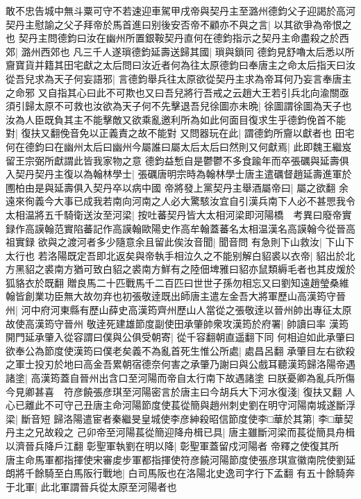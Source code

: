 敢不忠告城中無斗粟可守不若速迎車駕甲戌帝與契丹主至潞州德鈞父子迎謁於高河契丹主慰諭之父子拜帝於馬首進曰别後安否帝不顧亦不與之言|{
	以其欲爭為帝恨之也}
契丹主問德鈞曰汝在幽州所置銀鞍契丹直何在德鈞指示之契丹主命盡殺之於西郊|{
	潞州西郊也}
凡三千人遂瑣德鈞延壽送歸其國|{
	瑣與鎖同}
德鈞見舒嚕太后悉以所齎寶貨并籍其田宅獻之太后問曰汝近者何為往太原德鈞曰奉唐主之命太后指天曰汝從吾兒求為天子何妄語邪|{
	言德鈞舉兵往太原欲從契丹主求為帝耳何乃妄言奉唐主之命邪}
又自指其心曰此不可欺也又曰吾兒將行吾戒之云趙大王若引兵北向渝關亟須引歸太原不可救也汝欲為天子何不先擊退吾兒徐圖亦未晩|{
	徐圖謂徐圖為天子也}
汝為人臣既負其主不能擊敵又欲乘亂邀利所為如此何面目復求生乎德鈞俛首不能對|{
	復扶又翻俛音免以正義責之故不能對}
又問器玩在此|{
	謂德鈞所齎以獻者也}
田宅何在德鈞曰在幽州太后曰幽州今屬誰曰屬太后太后曰然則又何獻焉|{
	此即魏王繼岌留王宗弼所獻謂此皆我家物之意}
德鈞益慙自是鬱鬱不多食踰年而卒張礪與延壽俱入契丹契丹主復以為翰林學士|{
	張礪唐明宗時為翰林學士唐主遣礪督趙延壽進軍於圑柏由是與延壽俱入契丹卒以病中國}
帝將發上黨契丹主舉酒屬帝曰|{
	屬之欲翻}
余遠來徇義今大事已成我若南向河南之人必大驚駭汝宜自引漢兵南下人必不甚愳我令太相温將五千騎衛送汝至河梁|{
	按吐蕃契丹皆大太相河梁即河陽橋　考異曰廢帝實録作高謨翰范實陷蕃記作高謨翰歐陽史作高牟翰蓋蕃名太相温漢名高謨翰今從晉高祖實録}
欲與之渡河者多少隨意余且留此俟汝音聞|{
	聞音問}
有急則下山救汝|{
	下山下太行也}
若洛陽既定吾即北返矣與帝執手相泣久之不能别解白貂裘以衣帝|{
	貂出於北方黑貂之裘南方猶可致白貂之裘南方鮮有之陸佃埤雅曰貂亦鼠類縟毛者也其皮煖於狐貉衣於既翻}
贈良馬二十匹戰馬千二百匹曰世世子孫勿相忘又曰劉知遠趙瑩桑維翰皆創業功臣無大故勿弃也初張敬逹既出師唐主遣左金吾大將軍歷山高漢筠守晉州|{
	河中府河東縣有歷山薛史高漢筠齊州歷山人當從之張敬逹以晉州帥出專征太原故使高漢筠守晉州}
敬逹死建雄節度副使田承肇帥衆攻漢筠於府署|{
	帥讀曰率}
漢筠開門延承肇入從容謂曰僕與公俱受朝寄|{
	從千容翻朝直遥翻下同}
何相迫如此承肇曰欲奉公為節度使漢筠曰僕老矣義不為亂首死生惟公所處|{
	處昌呂翻}
承肇目左右欲殺之軍士投刃於地曰高金吾累朝宿德奈何害之承肇乃謝曰與公戲耳聽漢筠歸洛陽帝遇諸塗|{
	高漢筠蓋自晉州出含口至河陽而帝自太行南下故遇諸塗}
曰朕憂卿為亂兵所傷今見卿甚喜　符彦饒張彦琪至河陽密言於唐主曰今胡兵大下河水復淺|{
	復扶又翻}
人心已離此不可守己丑唐主命河陽節度使萇從簡與趙州刺史劉在明守河陽南城遂斷浮梁|{
	斷音短}
歸洛陽遣宦者秦繼旻皇城使李彦紳殺昭信節度使李□華於其第|{
	李□華契丹主之兄故殺之}
己卯帝至河陽萇從簡迎降舟楫已具|{
	唐主雖斷河梁而萇從簡具舟楫以濟晉兵降戶江翻}
彰聖軍執劉在明以降|{
	彰聖軍蓋留戍河陽者}
帝釋之使復其所　唐主命馬軍都指揮使宋審䖍步軍都指揮使符彦饒河陽節度使張彦琪宣徽南院使劉延朗將千餘騎至白馬阪行戰地|{
	白司馬阪也在洛陽北史逸司字行下孟翻}
有五十餘騎奔于北軍|{
	此北軍謂晉兵從太原至河陽者也}

